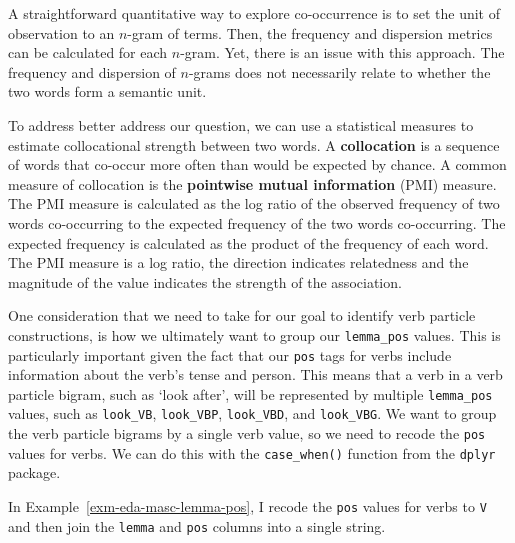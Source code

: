 \documentclass[
  letterpaper,
  DIV=11,
  numbers=noendperiod]{scrreprt}
\theoremstyle{definition}
\theoremstyle{remark}
\begin{document}
A straightforward quantitative way to explore co-occurrence is to set
the unit of observation to an \(n\)-gram of terms. Then, the frequency
and dispersion metrics can be calculated for each \(n\)-gram. Yet, there
is an issue with this approach. The frequency and dispersion of
\(n\)-grams does not necessarily relate to whether the two words form a
semantic unit.

To address better address our question, we can use a statistical
measures to estimate collocational strength between two words. A
\textbf{collocation} is a sequence of words that co-occur more often
than would be expected by chance. A common measure of collocation is the
\textbf{pointwise mutual information} (PMI) measure. The PMI measure is
calculated as the log ratio of the observed frequency of two words
co-occurring to the expected frequency of the two words co-occurring.
The expected frequency is calculated as the product of the frequency of
each word. The PMI measure is a log ratio, the direction indicates
relatedness and the magnitude of the value indicates the strength of the
association.

One consideration that we need to take for our goal to identify verb
particle constructions, is how we ultimately want to group our
\texttt{lemma\_pos} values. This is particularly important given the
fact that our \texttt{pos} tags for verbs include information about the
verb's tense and person. This means that a verb in a verb particle
bigram, such as `look after', will be represented by multiple
\texttt{lemma\_pos} values, such as \texttt{look\_VB},
\texttt{look\_VBP}, \texttt{look\_VBD}, and \texttt{look\_VBG}. We want
to group the verb particle bigrams by a single verb value, so we need to
recode the \texttt{pos} values for verbs. We can do this with the
\texttt{case\_when()} function from the \texttt{dplyr} package.

In Example~\ref{exm-eda-masc-lemma-pos}, I recode the \texttt{pos}
values for verbs to \texttt{V} and then join the \texttt{lemma} and
\texttt{pos} columns into a single string.
\end{document}
